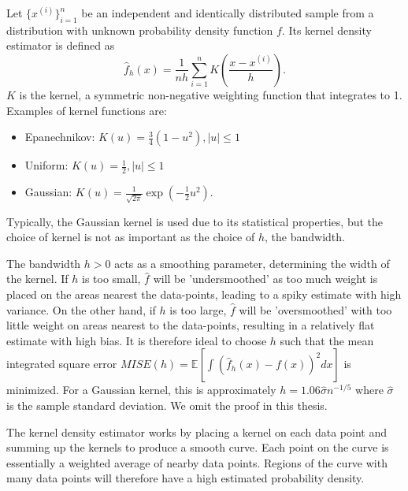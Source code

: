 \documentclass[honours,12pt]{unswthesis}
\newcommand{\E}{\mathbb{E}}
\numberwithin{equation}{section}
\theoremstyle{definition}
\begin{document}
Let $\{x^{(i)}\}^n_{i=1}$ be an independent and identically distributed sample from a distribution with unknown probability density function $f$. Its kernel density estimator is defined as
\[\hat{f}_h(x)=\frac{1}{nh}\sum^n_{i=1}K\left(\frac{x-x^{(i)}}{h}\right).\]
$K$ is the kernel, a symmetric non-negative weighting function that integrates to 1. Examples of kernel functions are:
\begin{itemize}
\item Epanechnikov: $K(u)=\frac{3}{4}(1-u^2), |u|\leq 1$
\item Uniform: $K(u)=\frac12, |u|\leq 1$
\item Gaussian: $K(u)=\frac{1}{\sqrt{2\pi}}\exp\left(-\frac{1}{2}u^2\right)$.
\end{itemize}
Typically, the Gaussian kernel is used due to its statistical properties, but the choice of kernel is not as important as the choice of $h$, the bandwidth.

The bandwidth $h>0$ acts as a smoothing parameter, determining the width of the kernel. If $h$ is too small, $\hat{f}$ will be 'undersmoothed' as too much weight is placed on the areas nearest the data-points, leading to a spiky estimate with high variance. On the other hand, if $h$ is too large, $\hat{f}$ will be 'oversmoothed' with too little weight on areas nearest to the data-points, resulting in a relatively flat estimate with high bias. It is therefore ideal to choose $h$ such that the mean integrated square error $MISE(h)=\E\left[\int(\hat{f}_h(x)-f(x))^2dx\right]$ is minimized. For a Gaussian kernel, this is approximately $h=1.06\hat{\sigma}n^{-1/5}$ where $\hat{\sigma}$ is the sample standard deviation. We omit the proof in this thesis.

The kernel density estimator works by placing a kernel on each data point and summing up the kernels to produce a smooth curve. Each point on the curve is essentially a weighted average of nearby data points. Regions of the curve with many data points will therefore have a high estimated probability density.
\end{document}
